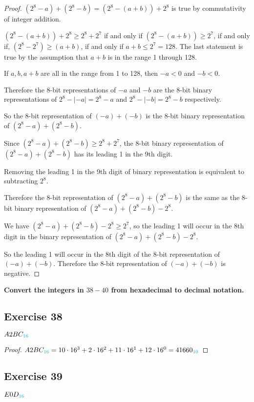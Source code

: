 \documentclass[14pt]{extarticle}
\newcommand{\base}[1]{{\color{cyan}#1}}
\begin{document}
\begin{proof}
    $(2^8 - a) + (2^8 - b) = (2^8 - (a + b)) + 2^8$ is true by commutativity of integer addition.

    $(2^8 - (a + b)) + 2^8 \geq 2^8 + 2^7$ if and only if $(2^8 - (a + b)) \geq 2^7$, if and only if, $(2^8 - 2^7) \geq (a + b)$, if and only if $a + b \leq 2^7 = 128$. The last statement is true by the assumption that $a+b$ is in the range 1 through 128.

    If $a, b, a+b$ are all in the range from 1 to 128, then $-a < 0$ and $-b < 0$.

    Therefore the 8-bit representations of $-a$ and $-b$ are the 8-bit binary representations of $2^8 - |-a| = 2^8 - a$ and $2^8 - |-b| = 2^8 - b$ respectively.

    So the 8-bit representation of $(-a) + (-b)$ is the 8-bit binary representation of $(2^8 - a) + (2^8 - b)$.

    Since $(2^8 - a) + (2^8 - b) \geq 2^8 + 2^7$, the 8-bit binary representation of $(2^8 - a) + (2^8 - b)$ has its leading 1 in the 9th digit.

    Removing the leading 1 in the 9th digit of binary representation is equivalent to subtracting $2^8$.

    Therefore the 8-bit representation of $(2^8 - a) + (2^8 - b)$ is the same as the 8-bit binary representation of $(2^8 - a) + (2^8 - b) - 2^8$.

    We have $(2^8 - a) + (2^8 - b) - 2^8 \geq 2^7$, so the leading 1 will occur in the 8th digit in the binary representation of $(2^8 - a) + (2^8 - b) - 2^8$.

    So the leading 1 will occur in the 8th digit of the 8-bit representation of $(-a) + (-b)$. Therefore the 8-bit representation of $(-a) + (-b)$ is negative.
\end{proof}

{\bf \color{cyan} Convert the integers in $38-40$ from hexadecimal to decimal notation.}

\subsection{Exercise 38}
$A2BC_\base{16}$

\begin{proof}
    $A2BC_\base{16} = 10 \cdot 16^3 + 2 \cdot 16^2 + 11 \cdot 16^1 +
        12 \cdot 16^0 = 41660_\base{10}$
\end{proof}

\subsection{Exercise 39}
$E0D_\base{16}$
\end{document}
